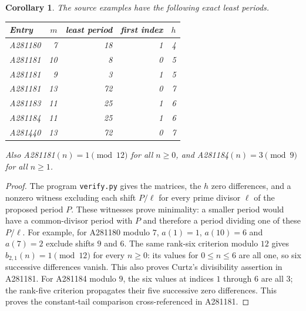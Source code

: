 \documentclass[11pt]{article}
\newtheorem{corollary}[theorem]{Corollary}
\begin{document}
\begin{corollary}\label{cor:certificates}
The source examples have the following exact least periods.
\begin{center}
\begin{tabular}{@{}lrrrr@{}}\toprule
Entry & $m$ & least period & first index & $h$\\\midrule
A281180 & 7 & 18 & 1 & 4\\
A281181 & 10 & 8 & 0 & 5\\
A281181 & 9 & 3 & 1 & 5\\
A281181 & 13 & 72 & 0 & 7\\
A281183 & 11 & 25 & 1 & 6\\
A281184 & 11 & 25 & 1 & 6\\
A281440 & 13 & 72 & 0 & 7\\\bottomrule
\end{tabular}
\end{center}
Also A281181$(n)=1\pmod{12}$ for all $n\ge0$, and
A281184$(n)=3\pmod9$ for all $n\ge1$.
\end{corollary}
\begin{proof}
The program \texttt{verify.py} gives the matrices, the $h$ zero
differences, and a nonzero witness excluding each shift $P/\ell$
for every prime divisor $\ell$ of the proposed period $P$.
These witnesses prove minimality: a smaller period would have
a common-divisor period with $P$ and therefore a period dividing
one of these $P/\ell$. For example, for A281180 modulo $7$,
$a(1)=1$, $a(10)=6$ and $a(7)=2$ exclude shifts $9$ and $6$.
The same rank-six criterion modulo $12$ gives
$b_{2,1}(n)=1\pmod{12}$ for every $n\ge0$: its values for
$0\le n\le6$ are all one, so six successive differences vanish.
This also proves Curtz's divisibility assertion in A281181.
For A281184 modulo $9$, the six values at indices $1$ through $6$
are all $3$; the rank-five criterion propagates their five successive
zero differences. This proves the constant-tail comparison
cross-referenced in A281181.
\end{proof}
\end{document}
